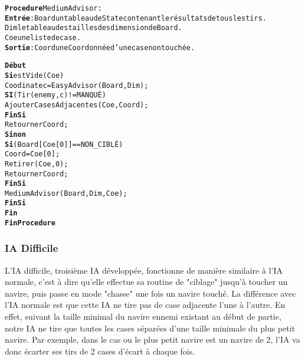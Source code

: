 \begin{alltt}
{\bf Procedure} MediumAdvisor :
    {\bf Entrée} : Board un tableau de State contenant le résultats de tous les tirs.
              Dim le tableau des tailles des dimension de Board.
              Coe une liste de case.
    {\bf Sortie} : Coord une Coordonnée d’une case non touchée.

    {\bf Début}
        {\bf Si} estVide(Coe) 
            Coodinate c = EasyAdvisor(Board, Dim) ;
            {\bf SI} (Tir(enemy, c) != MANQUÉ)
                AjouterCasesAdjacentes(Coe, Coord) ;
            {\bf FinSi}
            Retourner Coord ;
        {\bf Sinon} 
            {\bf Si} (Board[Coe[0]] == NON_CIBLÉ)
                Coord = Coe[0] ;
                Retirer(Coe, 0) ;
                Retourner Coord ;
            {\bf FinSi}
            MediumAdvisor(Board, Dim, Coe);
        {\bf FinSi}
    {\bf Fin}
{\bf Fin Procedure}            
\end{alltt}

\newpage

\subsubsection{IA Difficile}
    L'IA difficile, troisième IA développée, fonctionne de manière similaire à l'IA normale, c'est à dire qu'elle effectue sa routine de "ciblage" jusqu'à toucher un navire, puis passe en mode "chasse" une fois un navire touché.
    La différence avec l'IA normale est que cette IA ne tire pas de case adjacente l'une à l'autre. En effet, suivant la taille minimal du navire ennemi existant au début de partie, notre IA ne tire que toutes les cases séparées d'une taille minimale du plus petit navire.
    Par exemple, dans le cas ou le plus petit navire est un navire de 2, l'IA va donc écarter ses tirs de 2 cases d'écart à chaque fois.
    

